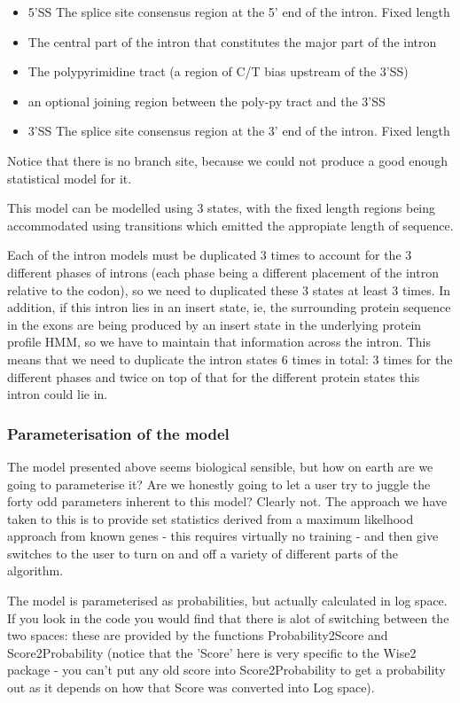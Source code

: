 \documentclass{article}
\begin{document}
\begin{itemize}
\item 5'SS The splice site consensus region at the 5' end of the intron. Fixed length
\item The central part of the intron that constitutes the major part of the intron
\item The polypyrimidine tract (a region of C/T bias upstream of the 3'SS)
\item an optional joining region between the poly-py tract and the 3'SS
\item 3'SS The splice site consensus region at the 3' end of the intron. Fixed length
\end{itemize}

Notice that there is no branch site, because we could not produce a good enough
statistical model for it.

This model can be modelled using 3 states, with the fixed length regions being
accommodated using transitions which emitted the appropiate length of sequence.

Each of the intron models must be duplicated 3 times to account for
the 3 different phases of introns (each phase being a different
placement of the intron relative to the codon), so we need to
duplicated these 3 states at least 3 times. In addition, if this
intron lies in an insert state, ie, the surrounding protein sequence
in the exons are being produced by an insert state in the underlying
protein profile HMM, so we have to maintain that information across
the intron. This means that we need to duplicate the intron states 6
times in total: 3 times for the different phases and twice on top of
that for the different protein states this intron could lie in.

\subsubsection{Parameterisation of the model}

The model presented above seems biological sensible, but how on earth are we
going to parameterise it? Are we honestly going to let a user try to juggle the
forty odd parameters inherent to this model? Clearly not. The approach we have
taken to this is to provide set statistics derived from a maximum likelhood approach
from known genes - this requires virtually no training - and then give switches
to the user to turn on and off a variety of different parts of the algorithm.

The model is parameterised as probabilities, but actually calculated
in log space.  If you look in the code you would find that there is alot of switching
between the two spaces: these are provided by the functions
Probability2Score and Score2Probability (notice that the 'Score' here
is very specific to the Wise2 package - you can't put any old score
into Score2Probability to get a probability out as it depends on how
that Score was converted into Log space).
\end{document}
